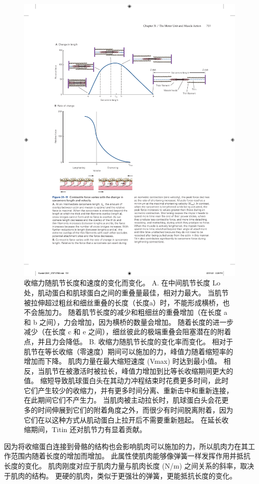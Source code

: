 \begin{figure}[htbp]
	\centering
	\includegraphics[width=0.9\linewidth]{chap31/fig_31_11}
	\caption{收缩力随肌节长度和速度的变化而变化。 A. 在中间肌节长度 Lo 处，肌动蛋白和肌球蛋白之间的重叠量最佳，相对力最大。 当肌节被拉伸超过粗丝和细丝重叠的长度（长度a）时，不能形成横桥，也不会施加力。 随着肌节长度的减少和粗细丝的重叠增加（在长度 a 和 b 之间），力会增加，因为横桥的数量会增加。 随着长度的进一步减少（在长度 c 和 e 之间），细丝彼此的极端重叠会阻塞潜在的附着点，并且力会降低。 B. 收缩力随肌节长度的变化率而变化。 相对于肌节在等长收缩（零速度）期间可以施加的力，峰值力随着缩短率的增加而下降。 肌肉力量在最大缩短速度 (Vmax) 时达到最小值。 相反，当肌节在被激活时被拉长，峰值力增加到比等长收缩期间更大的值。 缩短导致肌球蛋白头在其动力冲程结束时花费更多时间，此时它们产生较少的收缩力，并有更多时间分离、重新击中和重新连接，在此期间它们不产生力。 当肌肉被主动拉长时，肌球蛋白头会花更多的时间伸展到它们的附着角度之外，而很少有时间脱离附着，因为它们在以这种方式从肌动蛋白上拉开后不需要重新翘起。 在延长收缩期间，Titin 还对肌节力有显着贡献。}
	\label{fig:31_11}
\end{figure}


因为将收缩蛋白连接到骨骼的结构也会影响肌肉可以施加的力，所以肌肉力在其工作范围内随着长度的增加而增加。
此属性使肌肉能够像弹簧一样发挥作用并抵抗长度的变化。
肌肉刚度对应于肌肉力量与肌肉长度 (N/m) 之间关系的斜率，取决于肌肉的结构。
更硬的肌肉，类似于更强壮的弹簧，更能抵抗长度的变化。


